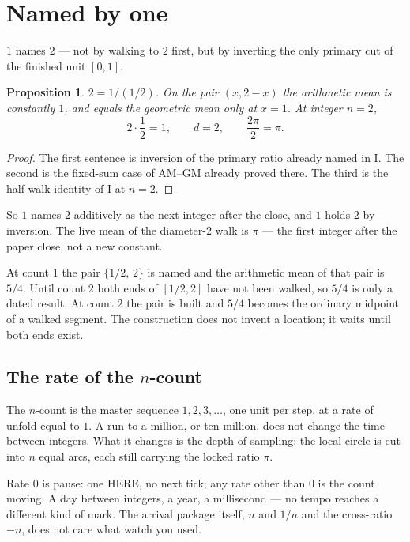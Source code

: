 \documentclass[10pt,a4paper]{article}
\theoremstyle{plain}
\newtheorem{proposition}{Proposition}
\theoremstyle{definition}
\theoremstyle{remark}
\begin{document}
\newpage
\tableofcontents
\newpage

\section{Named by one}

$1$ names $2$ --- not by walking to $2$ first, but by inverting the only primary cut of the finished unit $[0,1]$.

\begin{proposition}
\label{prop:two-named}
$2=1/(1/2)$.
On the pair $(x,2-x)$ the arithmetic mean is constantly $1$, and equals the geometric mean only at $x=1$.
At integer $n=2$,
\[
2\cdot\frac12=1,\qquad d=2,\qquad \frac{2\pi}{2}=\pi.
\]
\end{proposition}

\begin{proof}
The first sentence is inversion of the primary ratio already named in I.
The second is the fixed-sum case of AM--GM already proved there.
The third is the half-walk identity of I at $n=2$.
\end{proof}

So $1$ names $2$ additively as the next integer after the close, and $1$ holds $2$ by inversion.
The live mean of the diameter-$2$ walk is $\pi$ --- the first integer after the paper close, not a new constant.

At count $1$ the pair $\{1/2,\,2\}$ is named and the arithmetic mean of that pair is $5/4$.
Until count $2$ both ends of $[1/2,2]$ have not been walked, so $5/4$ is only a dated result.
At count $2$ the pair is built and $5/4$ becomes the ordinary midpoint of a walked segment.
The construction does not invent a location; it waits until both ends exist.

\subsection{The rate of the $n$-count}

The $n$-count is the master sequence $1,2,3,\ldots$, one unit per step, at a rate of unfold equal to $1$.
A run to a million, or ten million, does not change the time between integers.
What it changes is the depth of sampling: the local circle is cut into $n$ equal arcs, each still carrying the locked ratio $\pi$.

Rate $0$ is pause: one HERE, no next tick; any rate other than $0$ is the count moving.
A day between integers, a year, a millisecond --- no tempo reaches a different kind of mark.
The arrival package itself, $n$ and $1/n$ and the cross-ratio $-n$, does not care what watch you used.
\end{document}
